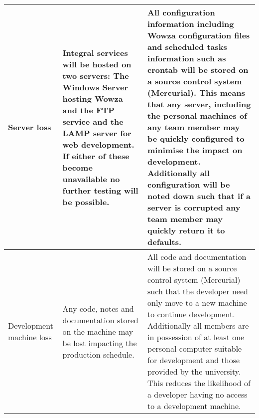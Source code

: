 \begin{center}
\begin{landscape}
\begin{longtable}{>{\raggedright}p{3cm}  >{\raggedright}p{7cm}  p{12cm}}
        Server loss                                      & Integral services will be hosted on two servers: The Windows Server hosting Wowza and the FTP service and the LAMP server for web development. If either of these become unavailable no further testing will be possible.                                                                                                                                                    & All configuration information including Wowza configuration files and scheduled tasks information such as crontab will be stored on a source control system (Mercurial). This means that any server, including the personal machines of any team member may be quickly configured to minimise the impact on development. Additionally all configuration will be noted down such that if a server is corrupted any team member may quickly return it to defaults.                                                                                                                                                                                                                                                                                                                                                                                                                                                                                                                                                                         \\ \midrule
        Development machine loss                         & Any code, notes and documentation stored on the machine may be lost impacting the production schedule.                                                                                                                                                                                                                                                                       & All code and documentation will be stored on a source control system (Mercurial) such that the developer need only move to a new machine to continue development. Additionally all members are in possession of at least one personal computer suitable for development and those provided by the university. This reduces the likelihood of a developer having no access to a development machine.                                                                                                                                                                                                                                                                                                                                                                                                                                                                                                                                                                                                                                      \\ \midrule

\end{longtable}
\end{landscape}
\end{center}
